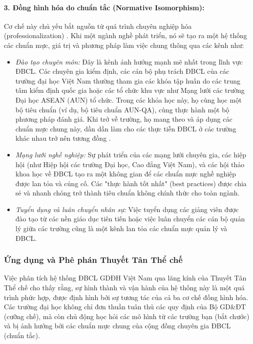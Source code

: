 \documentclass[12pt, a4paper, openany]{report}
\begin{document}
\paragraph{3. Đồng hình hóa do chuẩn tắc (Normative Isomorphism):}
Cơ chế này chủ yếu bắt nguồn từ quá trình chuyên nghiệp hóa (professionalization) \cite{DiMaggioPowell1983}. Khi một ngành nghề phát triển, nó sẽ tạo ra một hệ thống các chuẩn mực, giá trị và phương pháp làm việc chung thông qua các kênh như:
\begin{itemize}
    \item \textit{Đào tạo chuyên môn:} Đây là kênh ảnh hưởng mạnh mẽ nhất trong lĩnh vực ĐBCL. Các chuyên gia kiểm định, các cán bộ phụ trách ĐBCL của các trường đại học Việt Nam thường tham gia các khóa tập huấn do các trung tâm kiểm định quốc gia hoặc các tổ chức khu vực như Mạng lưới các trường Đại học ASEAN (AUN) tổ chức. Trong các khóa học này, họ cùng học một bộ tiêu chuẩn (ví dụ, bộ tiêu chuẩn AUN-QA), cùng thực hành một bộ phương pháp đánh giá. Khi trở về trường, họ mang theo và áp dụng các chuẩn mực chung này, dần dần làm cho các thực tiễn ĐBCL ở các trường khác nhau trở nên tương đồng \cite{AUN-QAGuide}.
    \item \textit{Mạng lưới nghề nghiệp:} Sự phát triển của các mạng lưới chuyên gia, các hiệp hội (như Hiệp hội các trường Đại học, Cao đẳng Việt Nam), và các hội thảo khoa học về ĐBCL tạo ra một không gian để các chuẩn mực nghề nghiệp được lan tỏa và củng cố. Các "thực hành tốt nhất" (best practices) được chia sẻ và nhanh chóng trở thành tiêu chuẩn không chính thức cho toàn ngành.
    \item \textit{Tuyển dụng và luân chuyển nhân sự:} Việc tuyển dụng các giảng viên được đào tạo từ các nền giáo dục tiên tiến hoặc việc luân chuyển các cán bộ quản lý giữa các trường cũng là một kênh lan tỏa các chuẩn mực quản lý và ĐBCL.
\end{itemize}

\subsubsection{Ứng dụng và Phê phán Thuyết Tân Thể chế}

Việc phân tích hệ thống ĐBCL GDĐH Việt Nam qua lăng kính của Thuyết Tân Thể chế cho thấy rằng, sự hình thành và vận hành của hệ thống này là một quá trình phức hợp, được định hình bởi sự tương tác của cả ba cơ chế đồng hình hóa. Các trường đại học không chỉ đơn thuần tuân thủ các quy định của Bộ GD\&ĐT (cưỡng chế), mà còn chủ động học hỏi các mô hình từ các trường bạn (bắt chước) và bị ảnh hưởng bởi các chuẩn mực chung của cộng đồng chuyên gia ĐBCL (chuẩn tắc).
\end{document}
